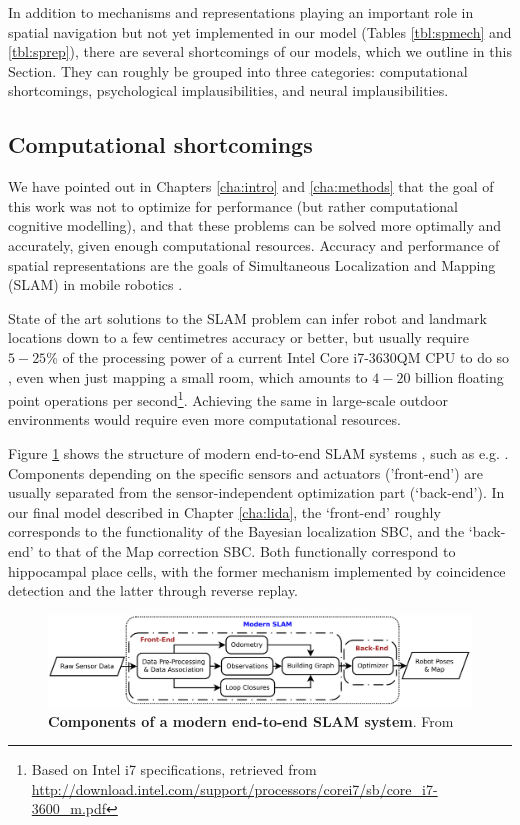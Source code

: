 In addition to mechanisms and representations playing an important role in spatial navigation but not yet implemented in our model (Tables \ref{tbl:spmech} and \ref{tbl:sprep}), there are several shortcomings of our models, which we outline in this Section. They can roughly be grouped into three categories: computational shortcomings, psychological implausibilities, and neural implausibilities.

\subsection{Computational shortcomings}

We have pointed out in Chapters \ref{cha:intro} and \ref{cha:methods} that the goal of this work was not to optimize for performance (but rather computational cognitive modelling), and that these problems can be solved more optimally and accurately, given enough computational resources. Accuracy and performance of spatial representations are the goals of Simultaneous Localization and Mapping (SLAM) in mobile robotics \citep{thrun2008simultaneous}. 

State of the art solutions to the SLAM problem can infer robot and landmark locations down to a few centimetres accuracy or better, but usually require $5-25 \%$ of the processing power of a current Intel Core i7-3630QM CPU to do so \citep{machado2013evaluation}, even when just mapping a small room, which amounts to $4-20$ billion floating point operations per second\footnote{Based on Intel i7 specifications, retrieved from  \url{http://download.intel.com/support/processors/corei7/sb/core_i7-3600_m.pdf}}. Achieving the same in large-scale outdoor environments would require even more computational resources.

Figure \ref{fig:endtoendslam} shows the structure of modern end-to-end SLAM systems \citep{wang2015}, such as e.g. \citep{newman2011describing}. Components depending on the specific sensors and actuators ('front-end') are usually separated from the sensor-independent optimization part (`back-end'). In our final model described in Chapter \ref{cha:lida}, the `front-end' roughly corresponds to the functionality of the Bayesian localization SBC, and the `back-end' to that of the Map correction SBC. Both functionally correspond to hippocampal place cells, with the former mechanism implemented by coincidence detection and the latter through reverse replay. 

\begin{figure}[h]
	\centering
	\includegraphics[width=\textwidth]{img/endtoendslam}
	\caption[Components of a modern end-to-end SLAM system]{\textbf{Components of a modern end-to-end SLAM system}. From \citep{wang2015}} 
	\label{fig:endtoendslam}
\end{figure}


